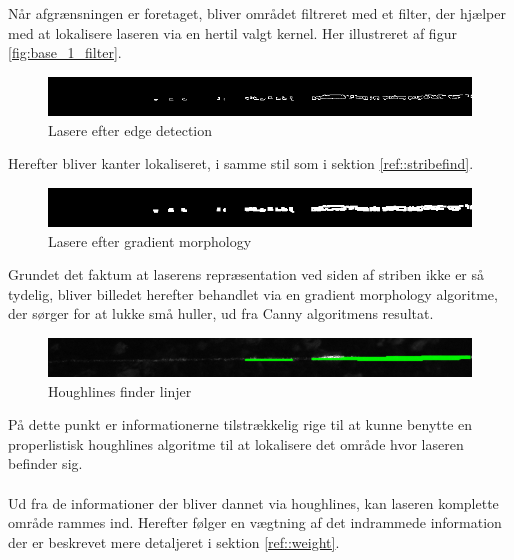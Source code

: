 Når afgrænsningen er foretaget, bliver området filtreret med et filter, der hjælper med at lokalisere laseren via en hertil valgt kernel. Her illustreret af figur \ref{fig:base_1_filter}.

\begin{figure}[h]
	\centering
	\includegraphics[width=0.7\linewidth]{Billeder/base_2_canny}
	\caption{Lasere efter edge detection}
	\label{fig:base_2_canny}
\end{figure}

Herefter bliver kanter lokaliseret, i samme stil som i sektion \ref{ref::stribefind}.


\begin{figure}[h]
	\centering
	\includegraphics[width=0.7\linewidth]{Billeder/base_3_morph}
	\caption{Lasere efter gradient morphology}
	\label{fig:base_3_morph}
\end{figure}

Grundet det faktum at laserens repræsentation ved siden af striben ikke er så tydelig, bliver billedet herefter behandlet via en gradient morphology algoritme, der sørger for at lukke små huller,
 ud fra Canny algoritmens resultat.

\begin{figure}[h!]
	\centering
	\includegraphics[width=0.7\linewidth]{Billeder/base_4_houghP}
	\caption{Houghlines finder linjer}
	\label{fig:base_4_hough}
\end{figure}

På dette punkt er informationerne tilstrækkelig rige til at kunne benytte en properlistisk houghlines algoritme til at lokalisere det område hvor laseren befinder sig.
\\\\
Ud fra de informationer der bliver dannet via houghlines, kan laseren komplette område rammes ind. Herefter følger en vægtning af det indrammede information der er beskrevet mere detaljeret i sektion \ref{ref::weight}.


